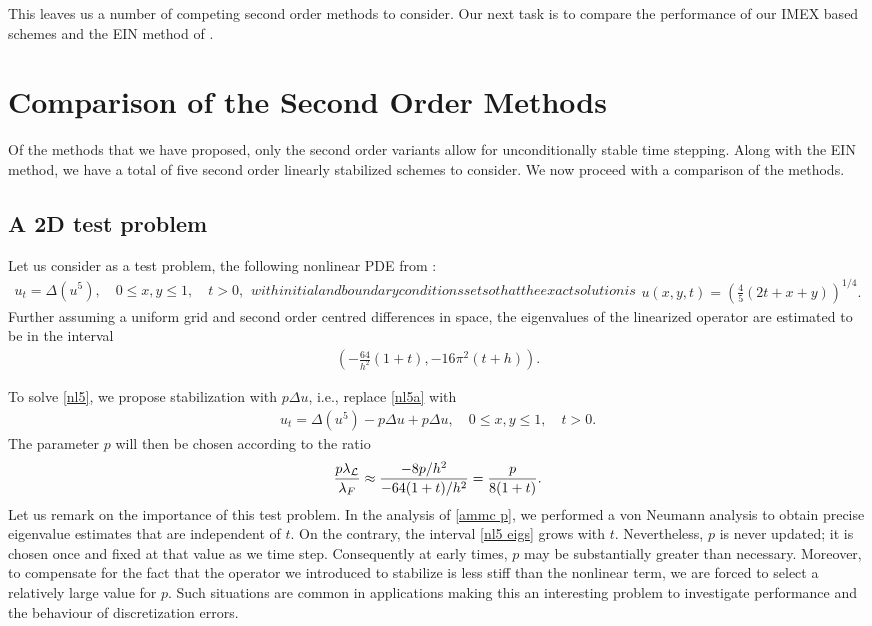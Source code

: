This leaves us a number of competing second order methods to consider. Our next task is to compare the performance of our IMEX based schemes and the EIN method of \cite{duchemin2014explicit}.

\section{Comparison of the Second Order Methods}
Of the methods that we have proposed, only the second order variants allow for unconditionally stable time stepping. Along with the EIN method, we have a total of five second order linearly stabilized schemes to consider. We now proceed with a comparison of the methods.

\subsection{A 2D test problem}
Let us consider as a test problem, the following nonlinear PDE from \cite{vdHouwen1982on}:
\begin{subequations}
        \begin{align}
                u_t = \Delta (u^5),
\quad 0\leq x,y\leq 1,
\quad t > 0,
\label{nl5a}
        \end{align}
with initial and boundary conditions set so that the exact solution is 
\begin{align}
u(x,y,t) = \left(\frac{4}{5}(2t+x+y)\right)^{1/4}.
\label{nl5b}
\end{align}
\label{nl5}%
\end{subequations}
Further assuming a uniform grid and second order centred differences in space, the eigenvalues of the linearized operator are estimated to be in the interval
\begin{align}
        \left(-\frac{64}{h^2}(1+t), -16\pi^2(t+h) \right).
\label{nl5 eigs}
\end{align}

To solve \cref{nl5}, we propose stabilization with $p\Delta u$, i.e., replace \cref{nl5a} with 
\begin{align}
        u_t = \Delta (u^5) - p\Delta u + p\Delta u, \quad 0\leq x,y\leq 1,
\quad t > 0.
\label{nl5 p}
\end{align}
The parameter $p$ will then be chosen according to the ratio
\begin{align}
        \frac{p\lambda_{\mathcal{L}}}{\lambda_F}
\approx \frac{-8p/h^2}{-64(1+t)/h^2}
= \frac{p}{8(1+t)}.
\end{align}
Let us remark on the importance of this test problem. In the analysis of \cref{ammc p}, we performed a von Neumann analysis to obtain precise eigenvalue estimates that are independent of $t$. On the contrary, the interval \cref{nl5 eigs} grows with $t$. Nevertheless, $p$ is never updated; it is chosen once and fixed at that value as we time step. Consequently at early times, $p$ may be substantially greater than necessary. Moreover, to compensate for the fact that the operator we introduced to stabilize is less stiff than the nonlinear term, we are forced to select a relatively large value for $p$. Such situations are common in applications making this an interesting problem to investigate performance and the behaviour of discretization errors.

